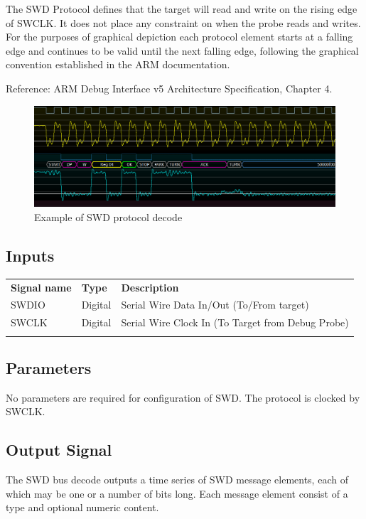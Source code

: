 The SWD Protocol defines that the target will read and write on the rising edge of SWCLK. It does not place any constraint
on when the probe reads and writes. For the purposes of graphical depiction each protocol element starts at a falling edge
and continues to be valid until the next falling edge, following the graphical convention established in the ARM documentation.

Reference: ARM Debug Interface v5 Architecture Specification, Chapter 4.

\begin{figure}[h]
\centering
\includegraphics[width=16cm]{images/filters/swd.png}
\caption{Example of SWD protocol decode}
\label{swd_example}
\end{figure}

\subsection{Inputs}

\begin{tabularx}{16cm}{llX}
\thickhline
\textbf{Signal name} & \textbf{Type} & \textbf{Description} \\
\thickhline
SWDIO & Digital & Serial Wire Data In/Out (To/From target)\\
SWCLK & Digital & Serial Wire Clock In (To Target from Debug Probe)\\
\thickhline
\end{tabularx}

\subsection{Parameters}

No parameters are required for configuration of SWD. The protocol is clocked by SWCLK.

\subsection{Output Signal}

The SWD bus decode outputs a time series of SWD message elements, each of which may be one or a number of bits long.
Each message element consist of a type and optional numeric content.

